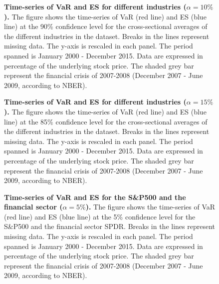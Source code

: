 \documentclass[11pt,a4paper,english]{article}
\begin{document}
\begin{figure}[H]
	\centering
	\captionsetup{singlelinecheck=true, font = footnotesize}
	\caption{
		\textbf{Time-series of VaR and ES for different industries ($\alpha=10\%$).}
		The figure shows the time-series of VaR (red line) and ES (blue line) at the 90\% confidence level for the cross-sectional averages of the different industries in the dataset. Breaks in the lines represent missing data. The y-axis is rescaled in each panel. The period spanned is January 2000 - December 2015. Data are expressed in percentage of the underlying stock price. The shaded grey bar represent the financial crisis of 2007-2008 (December 2007 - June 2009, according to NBER).}
	\label{fig: varcts10}
\end{figure}

\begin{figure}[H]
	\centering
	\captionsetup{singlelinecheck=true, font = footnotesize}
	\caption{
		\textbf{Time-series of VaR and ES for different industries ($\alpha=15\%$).}
		The figure shows the time-series of VaR (red line) and ES (blue line) at the 85\% confidence level for the cross-sectional averages of the different industries in the dataset. Breaks in the lines represent missing data. The y-axis is rescaled in each panel. The period spanned is January 2000 - December 2015. Data are expressed in percentage of the underlying stock price. The shaded grey bar represent the financial crisis of 2007-2008 (December 2007 - June 2009, according to NBER).}
	\label{fig: varcts15}
\end{figure}

\begin{figure}[H]
	\centering
	\captionsetup{singlelinecheck=true, font = footnotesize}
	\caption{
		\textbf{Time-series of VaR and ES for the S\&P500 and the financial sector ($\alpha=5\%$).}
		The figure shows the time-series of VaR (red line) and ES (blue line) at the 5\% confidence level for the S\&P500 and the financial sector SPDR. Breaks in the lines represent missing data. The y-axis is rescaled in each panel. The period spanned is January 2000 - December 2015. Data are expressed in percentage of the underlying stock price. The shaded grey bar represent the financial crisis of 2007-2008 (December 2007 - June 2009, according to NBER).}
	\label{fig: varctsmkt5}
\end{figure}
\end{document}
